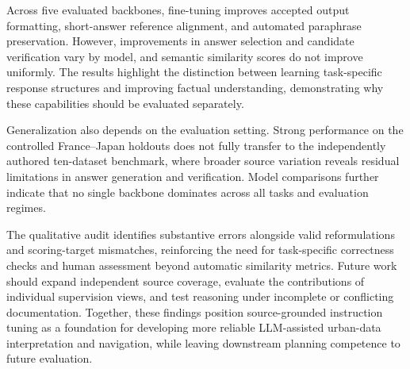 \documentclass[a4paper,fleqn]{cas-sc}
\begin{document}
Across five evaluated backbones, fine-tuning improves accepted output formatting, short-answer reference alignment, and automated paraphrase preservation. However, improvements in answer selection and candidate verification vary by model, and semantic similarity scores do not improve uniformly. The results highlight the distinction between learning task-specific response structures and improving factual understanding, demonstrating why these capabilities should be evaluated separately.

Generalization also depends on the evaluation setting. Strong performance on the controlled France--Japan holdouts does not fully transfer to the independently authored ten-dataset benchmark, where broader source variation reveals residual limitations in answer generation and verification. Model comparisons further indicate that no single backbone dominates across all tasks and evaluation regimes.

The qualitative audit identifies substantive errors alongside valid reformulations and scoring-target mismatches, reinforcing the need for task-specific correctness checks and human assessment beyond automatic similarity metrics. Future work should expand independent source coverage, evaluate the contributions of individual supervision views, and test reasoning under incomplete or conflicting documentation. Together, these findings position source-grounded instruction tuning as a foundation for developing more reliable LLM-assisted urban-data interpretation and navigation, while leaving downstream planning competence to future evaluation.

\FloatBarrier
\end{document}
